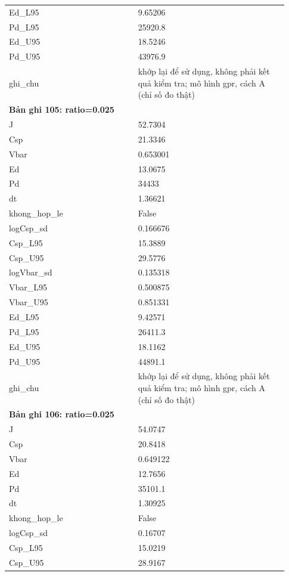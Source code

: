 \begin{longtable}{p{0.43\linewidth}p{0.50\linewidth}}
Ed\_\allowbreak L95 & 9.65206 \\
Pd\_\allowbreak L95 & 25920.8 \\
Ed\_\allowbreak U95 & 18.5246 \\
Pd\_\allowbreak U95 & 43976.9 \\
ghi\_\allowbreak chu & khớp lại để sử dụng, không phải kết quả kiểm tra; mô hình gpr, cách A (chỉ số đo thật) \\
\midrule
\multicolumn{2}{p{0.95\linewidth}}{\textbf{Bản ghi 105: ratio=0.025}} \\
J & 52.7304 \\
Csp & 21.3346 \\
Vbar & 0.653001 \\
Ed & 13.0675 \\
Pd & 34433 \\
dt & 1.36621 \\
khong\_\allowbreak hop\_\allowbreak le & False \\
logCsp\_\allowbreak sd & 0.166676 \\
Csp\_\allowbreak L95 & 15.3889 \\
Csp\_\allowbreak U95 & 29.5776 \\
logVbar\_\allowbreak sd & 0.135318 \\
Vbar\_\allowbreak L95 & 0.500875 \\
Vbar\_\allowbreak U95 & 0.851331 \\
Ed\_\allowbreak L95 & 9.42571 \\
Pd\_\allowbreak L95 & 26411.3 \\
Ed\_\allowbreak U95 & 18.1162 \\
Pd\_\allowbreak U95 & 44891.1 \\
ghi\_\allowbreak chu & khớp lại để sử dụng, không phải kết quả kiểm tra; mô hình gpr, cách A (chỉ số đo thật) \\
\midrule
\multicolumn{2}{p{0.95\linewidth}}{\textbf{Bản ghi 106: ratio=0.025}} \\
J & 54.0747 \\
Csp & 20.8418 \\
Vbar & 0.649122 \\
Ed & 12.7656 \\
Pd & 35101.1 \\
dt & 1.30925 \\
khong\_\allowbreak hop\_\allowbreak le & False \\
logCsp\_\allowbreak sd & 0.16707 \\
Csp\_\allowbreak L95 & 15.0219 \\
Csp\_\allowbreak U95 & 28.9167 \\

\end{longtable}
